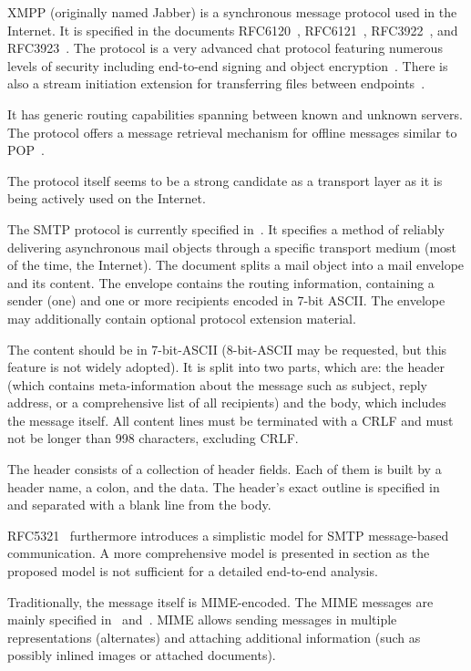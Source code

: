 XMPP (originally named Jabber) is a synchronous message protocol used in the Internet. It is specified in the documents RFC6120~\cite{rfc6120}, RFC6121~\cite{rfc6121}, RFC3922~\cite{rfc3922}, and RFC3923~\cite{rfc3923}. The protocol is a very advanced chat protocol featuring numerous levels of security including end-to-end signing and object encryption~\cite{rfc3923}. There is also a stream initiation extension for transferring files between endpoints~\cite{xep0096}.

It has generic routing capabilities spanning between known and unknown servers. The protocol offers a message retrieval mechanism for offline messages similar to POP~\cite{xep0013}.

The protocol itself seems to be a strong candidate as a transport layer as it is being actively used on the Internet.

The SMTP protocol is currently specified in~\cite{rfc5321}. It specifies a method of reliably delivering asynchronous mail objects through a specific transport medium (most of the time, the Internet). The document splits a mail object into a mail envelope and its content. The envelope contains the routing information, containing a sender (one) and one or more recipients encoded in 7-bit ASCII. The envelope may additionally contain optional protocol extension material. 

The content should be in 7-bit-ASCII (8-bit-ASCII may be requested, but this feature is not widely adopted). It is split into two parts, which are: the header (which contains meta-information about the message such as subject, reply address, or a comprehensive list of all recipients) and the body, which includes the message itself. All content lines must be terminated with a CRLF and must not be longer than 998 characters, excluding CRLF.

The header consists of a collection of header fields. Each of them is built by a header name, a colon, and the data. The header's exact outline is specified in~\cite{rfc5322} and separated with a blank line from the body. 

RFC5321~\cite{rfc5321} furthermore introduces a simplistic model for SMTP message-based communication. A more comprehensive model is presented in section  as the proposed model is not sufficient for a detailed end-to-end analysis.

Traditionally, the message itself is MIME-encoded. The MIME messages are mainly specified in~\cite{rfc2045} and~\cite{rfc2046}. MIME allows sending messages in multiple representations (alternates) and attaching additional information (such as possibly inlined images or attached documents). 

